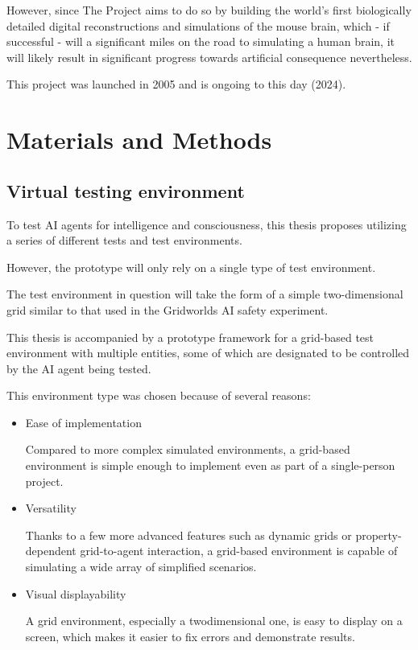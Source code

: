 \documentclass[masterthesis]{fer}
\begin{document}
However, since The Project aims to do so by building the world’s first biologically detailed digital reconstructions and simulations of the mouse brain, which - if successful - will a significant miles on the road to simulating a human brain, it will likely result in significant progress towards artificial consequence nevertheless.

This project was launched in 2005 and is ongoing to this day (2024).
\chapter{Materials and Methods}
\label{sec:materialsandmethods}
\section{Virtual testing environment}
To test AI agents for intelligence and consciousness, this thesis proposes utilizing a series of different tests and test environments.

However, the prototype will only rely on a single type of test environment.

The test environment in question will take the form of a simple two-dimensional grid similar to that used in the Gridworlds AI safety experiment.

This thesis is accompanied by a prototype framework for a grid-based test environment with multiple entities, some of which are designated to be controlled by the AI agent being tested.

This environment type was chosen because of several reasons:
\begin{itemize}
\item{Ease of implementation}

Compared to more complex simulated environments,
a grid-based environment is simple enough to implement even as part
of a single-person project.

\item{Versatility}

Thanks to a few more advanced features such as dynamic grids or
property-dependent grid-to-agent interaction, a grid-based environment is capable of simulating a wide array of simplified scenarios.

\item{Visual displayability}

A grid environment, especially a twodimensional one, is easy to display on a screen, which makes it easier to fix errors and demonstrate results.
\end{itemize}
\end{document}
